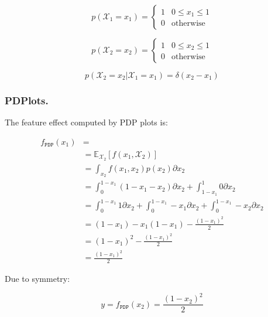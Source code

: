 \documentclass[runningheads, envcountsame, a4paper]{llncs}
\newcommand{\E}{\mathbb{E}}
\begin{document}
\begin{equation}
  \label{eq:marginal}
  p(\mathcal{X}_1 = x_1) =
  \begin{cases}
    1 & 0 \leq x_1 \leq 1 \\
    0 & \text{otherwise}
  \end{cases}
\end{equation}

\begin{equation}
  \label{eq:marginal}
  p(\mathcal{X}_2 = x_2) =
  \begin{cases}
    1 & 0 \leq x_2 \leq 1 \\
    0 & \text{otherwise}
  \end{cases}
\end{equation}

\begin{equation}
  \label{eq:marginal}
  p(\mathcal{X}_2 = x_2|\mathcal{X}_1 = x_1) = \delta(x_2-x_1)
\end{equation}


\subsubsection*{PDPlots.}

The feature effect computed by PDP plots is:

\begin{equation}
  \label{eq:example-1-pdp}
  \begin{split}
    f_{\mathtt{PDP}}(x_1) &= \\
    & = \mathbb{\E}_{\mathcal{X}_2}[f(x_1,\mathcal{X}_2)] \\
    & = \int_{x_2} f(x_1, x_2) p(x_2) \partial x_2 \\
    & = \int_{0}^{1-x_1} (1 - x_1 - x_2) \partial x_2 + \int_{1-x_1}^1 0 \partial x_2 \\
    & = \int_{0}^{1-x_1} 1 \partial x_2 + \int_{0}^{1-x_1} -x_1 \partial x_2 + \int_{0}^{1-x_1} -x_2 \partial x_2 \\
    & = (1 - x_1) -x_1(1-x_1) - \frac{{(1-x_1)}^2}{2} \\
    & = (1 - x_1)^2 - \frac{{(1-x_1)}^2}{2} \\
    & = \frac{{(1-x_1)}^2}{2}
  \end{split}
\end{equation}

%
Due to symmetry:

\begin{equation}
y = f_{\mathtt{PDP}}(x_2) = \frac{{(1-x_2)}^2}{2}
\end{equation}
\end{document}
